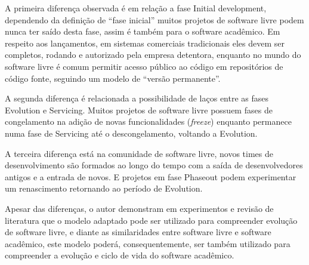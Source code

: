 A primeira diferença observada é em relação a fase Initial development,
dependendo da definição de ``fase inicial'' muitos projetos de software livre
podem nunca ter saído desta fase, assim é também para o software acadêmico. Em respeito aos lançamentos,
em sistemas comerciais tradicionais eles devem ser completos, rodando e autorizado
pela empresa detentora, enquanto no mundo do software livre é comum
permitir acesso público ao código em repositórios de código fonte, seguindo
um modelo de ``versão permanente''.

A segunda diferença é relacionada a possibilidade de laços entre
as fases Evolution e Servicing. Muitos projetos de software livre
possuem fases de congelamento na adição de novas funcionalidades ({\it freeze})
enquanto permanece numa fase de Servicing até o descongelamento, voltando
a Evolution.

A terceira diferença está na comunidade de software livre,
novos times de desenvolvimento são formados ao longo do tempo
com a saída de desenvolvedores antigos e a entrada de novos.
E projetos em fase Phaseout podem experimentar um renascimento
retornando ao período de Evolution.

Apesar das diferenças, o autor  demonstram em experimentos e
revisão de literatura que o modelo adaptado pode ser utilizado para
compreender evolução de software livre, e diante as similaridades entre software livre
e software acadêmico, este modelo poderá, consequentemente, ser também
utilizado para compreender a evolução e ciclo de vida do software acadêmico.
